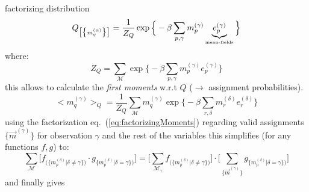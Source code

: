 factorizing distribution
\begin{equation}
	Q_{ \big[ \big\{ m_q^{(\alpha)} \big\} \big] }
	= \frac{1}{Z_Q} \exp \Big\{ -\beta \sum\limits_{p, \gamma}
		m_p^{(\gamma)} \underbrace{ e_p^{(\gamma)} }_{
			\text{{\tiny mean-fields}} } \Big\}
\end{equation}
where:
\begin{equation}
	Z_Q = \sum\limits_{\mathscr{M}} \exp \Big\{ -\beta \sum\limits_{p, 
		\gamma} m_p^{(\gamma)} e_p^{(\gamma)} \Big\}
\end{equation}
this allows to calculate the \emph{first moments} w.r.t $Q$ ($\rightarrow$
assignment probabilities).
\begin{equation}
	\big< m_q^{(\gamma)} \big>_Q
	= \frac{1}{Z_Q} \sum\limits_{\mathscr{M}} m_q^{(\gamma)}
		\exp \Big\{ -\beta \sum\limits_{r, \delta} 
		m_{r}^{(\delta)} e_{r}^{(\delta)} \Big\}
\end{equation}
using the factorization eq.~(\ref{eq:factorizingMoments}) regarding valid assignments $\big\{ \vec{m}^{(\gamma)} \big\}$ for observation $\gamma$ and the rest of the variables  this simplifies (for any functions $f,g$) to:
\begin{equation}
	\sum\limits_{\mathscr{M}} \bigg[ f_{ \big( \big\{ m_p^{(\delta)} 
		\big| \delta \neq \gamma \big\} \big) }
		\cdot g_{ \big\{ m_p^{(\delta)} \big| \delta = \gamma 
			\big\} \big) }
		\bigg]
	= \bigg[ \sum\limits_{\mathscr{M}_{\gamma}} f_{ \big( \big\{ 
		m_p^{(\delta)} \big| \delta \neq \gamma \big\} \big) }
		\bigg] \cdot \bigg[ \sum\limits_{\big\{ \vec{m}^{(\gamma)} 
			\big\} } g_{ \big\{ m_p^{(\delta)} \big| \delta = 
			\gamma \big\} \big) } \bigg]
\end{equation}
and finally gives
